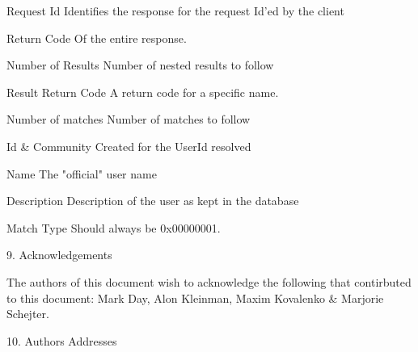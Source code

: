 \documentclass[titlepage,oneside]{book}
\begin{document}
Request Id
  Identifies the response for the request Id'ed by the client

Return Code
  Of the entire response.

Number of Results
  Number of nested results to follow

Result Return Code
  A return code for a specific name.

Number of matches
  Number of matches to follow

Id & Community
  Created for the UserId resolved

Name
  The "official" user name

Description
  Description of the user as kept in the database

Match Type Should always be 0x00000001.

9. Acknowledgements

The authors of this document wish to acknowledge the following that
contirbuted to this document: Mark Day, Alon Kleinman, Maxim Kovalenko
& Marjorie Schejter.

10. Authors Addresses
\end{document}
